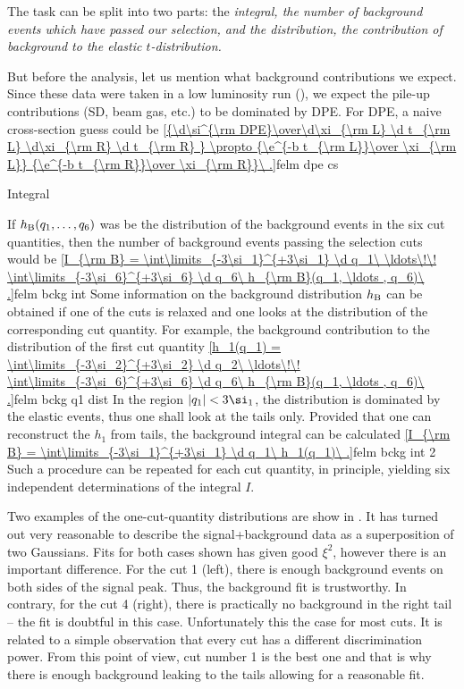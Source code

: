 The task can be split into two parts: the \em{integral}, the number of background events which have passed our selection, and the \em{distribution}, the contribution of background to the elastic $t$-distribution.

But before the analysis, let us mention what background contributions we expect. Since these data were taken in a low luminosity run (), we expect the pile-up contributions (SD, beam gas, etc.) to be dominated by DPE. For DPE, a naive cross-section guess could be 
\eqref{{\d\si^{\rm DPE}\over\d\xi_{\rm L} \d t_{\rm L} \d\xi_{\rm R} \d t_{\rm R} } \propto {\e^{-b t_{\rm L}}\over \xi_{\rm L}} {\e^{-b t_{\rm R}}\over \xi_{\rm R}}\ .}{felm dpe cs}

\caption{Integral}

If $h_{\rm B}(q_1, \ldots , q_6)$ was be the distribution of the background events in the six cut quantities, then the number of background events passing the selection cuts would be
\eqref{I_{\rm B} = \int\limits_{-3\si_1}^{+3\si_1} \d q_1\ \ldots\!\! \int\limits_{-3\si_6}^{+3\si_6} \d q_6\  h_{\rm B}(q_1, \ldots , q_6)\ .}{felm bckg int}
Some information on the background distribution $h_{\rm B}$ can be obtained if one of the cuts is relaxed and one looks at the distribution of the corresponding cut quantity. For example, the background contribution to the distribution of the first cut quantity
\eqref{h_1(q_1) = \int\limits_{-3\si_2}^{+3\si_2} \d q_2\ \ldots\!\! \int\limits_{-3\si_6}^{+3\si_6} \d q_6\  h_{\rm B}(q_1, \ldots , q_6)\ .}{felm bckg q1 dist}
In the region $|q_1| < 3\si_1$, the distribution is dominated by the elastic events, thus one shall look at the tails only. Provided that one can reconstruct the $h_1$ from tails, the background integral can be calculated
\eqref{I_{\rm B} = \int\limits_{-3\si_1}^{+3\si_1} \d q_1\ h_1(q_1)\ .}{felm bckg int 2}
Such a procedure can be repeated for each cut quantity, in principle, yielding six independent determinations of the integral $I$.


Two examples of the one-cut-quantity distributions are show in . It has turned out very reasonable to describe the signal+background data as a superposition of two Gaussians. Fits for both cases shown has given good $\xi^2$, however there is an important difference. For the cut 1 (left), there is enough background events on both sides of the signal peak. Thus, the background fit is trustworthy. In contrary, for the cut 4 (right), there is practically no background in the right tail -- the fit is doubtful in this case. Unfortunately this the case for most cuts. It is related to a simple observation that every cut has a different discrimination power. From this point of view, cut number 1 is the best one and that is why there is enough background leaking to the tails allowing for a reasonable fit.

